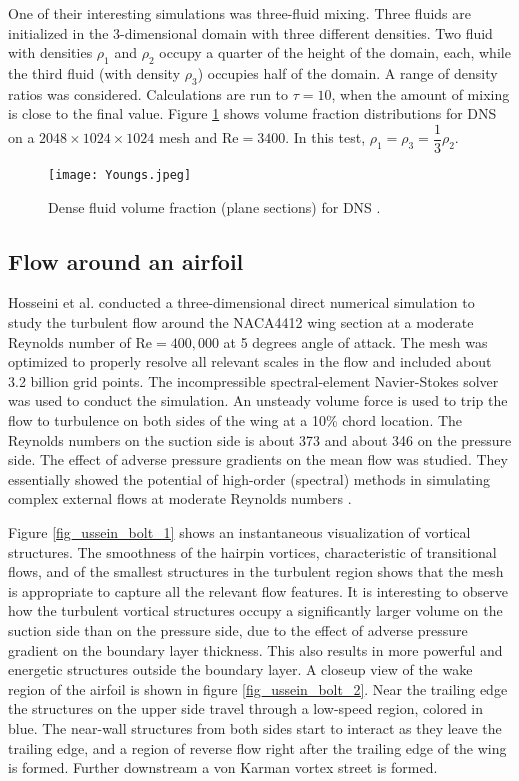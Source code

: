 \documentclass[12pt,oneside,a4paper,english]{article}
\begin{document}
One of their interesting simulations was three-fluid mixing. Three fluids are initialized in the 3-dimensional domain with three different densities. Two fluid with densities $\rho_1$ and $\rho_2$ occupy a quarter of the height of the domain, each, while the third fluid (with density $\rho_3$) occupies half of the domain. A range of density ratios was considered. Calculations are run to $\tau = 10$, when the amount of mixing is close to the final value. Figure \ref{fig_Youngs_1} shows volume fraction distributions for DNS on a $2048 \times 1024 \times 1024$ mesh and Re$=3400$. In this test, $\rho_1=\rho_3=\dfrac{1}{3} \rho_2$.

\begin{figure}[H]
    \centering
    \texttt{[image: Youngs.jpeg]}
    \caption[Dense fluid volume fraction (plane sections) for DNS]{Dense fluid volume fraction (plane sections) for DNS \cite{youngs2017rayleigh}.}
    \label{fig_Youngs_1}
\end{figure}






\subsection{Flow around an airfoil}
Hosseini et al. conducted a three-dimensional direct numerical simulation to study the turbulent flow around the NACA4412 wing section at a moderate Reynolds number of Re$=400,000$ at 5 degrees angle of attack. The mesh was optimized to properly resolve all relevant scales in the flow and included about 3.2 billion grid points. The incompressible spectral-element Navier-Stokes solver was used to conduct the simulation. An unsteady volume force is used to trip the flow to turbulence on both sides of the wing at a 10\% chord location. The Reynolds numbers on the suction side is about 373 and about 346 on the pressure side. The effect of adverse pressure gradients on the mean flow was studied. They essentially showed the potential of high-order (spectral) methods in simulating complex external flows at moderate Reynolds numbers \cite{hosseini2016direct}.

Figure \ref{fig_ussein_bolt_1} shows an instantaneous visualization of vortical structures. The smoothness of the hairpin vortices, characteristic of transitional flows, and of the smallest structures in the turbulent region shows that the mesh is appropriate to capture all the relevant flow features. It is interesting to observe how the turbulent vortical structures occupy a significantly larger volume on the suction side than on the pressure side, due to the effect of adverse pressure gradient on the boundary layer thickness. This also results in more powerful and energetic structures outside the boundary layer. A closeup view of the wake region of the airfoil is shown in figure \ref{fig_ussein_bolt_2}. Near the trailing edge the structures on the upper side travel through a low-speed region, colored in blue. The near-wall structures from both sides start to interact as they leave the trailing edge, and a region of reverse flow right after the trailing edge of the wing is formed. Further downstream a von Karman vortex street is formed.
\end{document}
